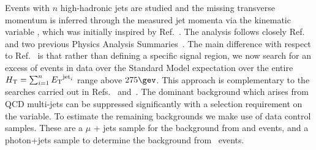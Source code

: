 Events with $n$ high-\pt hadronic jets are studied and the missing
transverse momentum is inferred through the measured jet momenta via 
the kinematic variable \alt, which was initially inspired by Ref.~\cite{Randall:2008rw}. 
The analysis follows closely Ref.~\cite{RA1Paper} and two previous
Physics Analysis Summaries~\cite{cms-pas-sus-09001,cms-pas-sus-08005}. 
The main difference with respect to Ref.~\cite{RA1Paper} is that
rather than defining a specific signal region, we now search for an excess of
events in data over the Standard Model expectation over the entire 
$\mbox{$H_\text{T}$} = \sum_{i=1}^{n} {E_{\text T}}^{ {\rm jet}_i}$ range above $275 \gev$.
This approach is complementary to the searches carried out
in Refs.~\cite{RA2} and~\cite{Razor}.
The dominant background which arises from QCD multi-jets can be suppressed significantly with a selection requirement on the \alt variable.
To estimate the remaining
backgrounds we make use of data control samples. These are a $\mu$ + jets
sample for the background from \wj and \ttbar events, and a photon+jets sample
to determine the background from \znunu\ events. 





